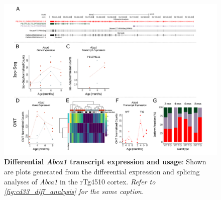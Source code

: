 \begin{landscape}
	\begin{figure}[htp]
		\begin{center}
			\includegraphics[page=1,trim={0 0.5cm 0 1.5cm},scale =0.85]{Figures/TargetGene_DifferentialAnalysis.pdf}
		\end{center}
		\captionsetup{width=1.5\textwidth}
		\caption[Differential \textit{Abca1} transcript expression and usage]%
		{\textbf{Differential \textit{Abca1} transcript expression and usage}: Shown are plots generated from the differential expression and splicing analyses of \textit{Abca1} in the rTg4510 cortex. \textit{Refer to \cref{fig:cd33_diff_analysis} for the same caption.}}   
		\label{fig:abca1_diff_analysis}
	\end{figure}
\end{landscape}

